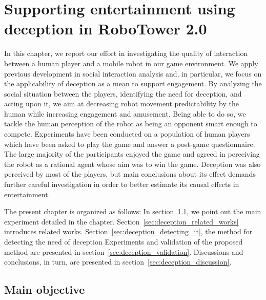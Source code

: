 \chapter{Supporting entertainment using deception in RoboTower 2.0}\label{ch:deception}

In this chapter, we report our effort in investigating the quality of interaction between a human player and a mobile robot in our game environment. %
We apply previous development in social interaction analysis and, in particular, we focus on the applicability of deception as a mean to support engagement. By analyzing the social situation between the players, identifying the need for deception, and acting upon it, we aim at decreasing robot movement predictability by the human while increasing engagement and amusement. Being able to do so, we tackle the human perception of the robot as being an opponent smart enough to compete. Experiments have been conducted on a population of human players which have been asked to play the game and answer a post-game questionnaire. The large majority of the participants enjoyed the game and agreed in perceiving the robot as a rational agent whose aim was to win the game. Deception was also perceived by most of the players, but main conclusions about its effect demands further careful investigation in order to better estimate its causal effects in entertainment.

The present chapter is organized as follows: In section~\ref{sec:deception_main_objectives}, we point out the main experiment detailed in the chapter. Section~\ref{sec:deception_related_works} introduces related works. Section~\ref{sec:deception_detecting_it}, the method for detecting the need of deception%
Experiments and validation of the proposed method are presented in section~\ref{sec:deception_validation}. Discussions and conclusions, in turn, are presented in section~\ref{sec:deception_discussion}.

\section{Main objective} \label{sec:deception_main_objectives}

